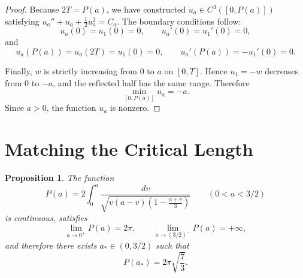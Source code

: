 \documentclass{article}
\newtheorem{proposition}[lemma]{Proposition}
\begin{document}
\begin{proof}
Because $2T = P(a)$, we have constructed $u_a \in C^3([0,P(a)])$ satisfying $u_a'' + u_a + \frac{1}{2}u_a^2 = C_a$. The boundary conditions follow:
\[
u_a(0) = u_1(0) = 0, \qquad u_a'(0) = u_1'(0) = 0,
\]
and
\[
u_a(P(a)) = u_a(2T) = u_1(0) = 0, \qquad u_a'(P(a)) = -u_1'(0) = 0.
\]

Finally, $w$ is strictly increasing from $0$ to $a$ on $[0,T]$. Hence $u_1 = -w$ decreases from $0$ to $-a$, and the reflected half has the same range. Therefore
\[
\min_{[0,P(a)]} u_a = -a.
\]
Since $a > 0$, the function $u_a$ is nonzero.
\end{proof}

\section{Matching the Critical Length}

\begin{proposition}\label{prop:matching}
The function
\[
P(a) = 2\int_0^a \frac{dv}{\sqrt{v(a-v)\!\left(1 - \frac{a+v}{3}\right)}} \qquad (0 < a < 3/2)
\]
is continuous, satisfies
\[
\lim_{a \to 0^+} P(a) = 2\pi, \qquad \lim_{a \to (3/2)^-} P(a) = +\infty,
\]
and therefore there exists $a_* \in (0, 3/2)$ such that
\[
P(a_*) = 2\pi\sqrt{\frac{7}{3}}.
\]
\end{proposition}
\end{document}
